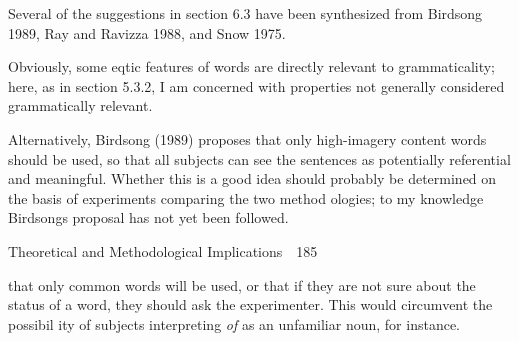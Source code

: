 \begin{listWWNumxxleveli}
\item 
\begin{styleStandard}
Several of the suggestions in section 6.3 have been synthesized from Birdsong 1989, Ray and Ravizza 1988, and Snow 1975.
\end{styleStandard}


\item 
\begin{styleStandard}
Obviously, some eqtic features of words are directly relevant to grammaticality; here, as in section 5.3.2, I am concerned with properties not generally considered grammatically relevant.
\end{styleStandard}


\item 
\begin{styleStandard}
Alternatively, Birdsong (1989) proposes that only high-imagery content words should be used, so that all subjects can see the sentences as potentially referential and meaningful. Whether this is a good idea should probably be determined on the basis of experiments comparing the two method\- ologies; to my knowledge Birdsong{\textquotesingle}s proposal has not yet been followed.
\end{styleStandard}


\end{listWWNumxxleveli}
\clearpage\setcounter{page}{1}\begin{styleStandard}
Theoretical and Methodological Implications\ \ 185
\end{styleStandard}


\begin{styleStandard}
that only common words will be used, or that if they are not sure about the status of a word, they should ask the experimenter. This would circumvent the possibil\- ity of subjects interpreting \textit{of}\textit{ }as an unfamiliar noun, for instance.
\end{styleStandard}


